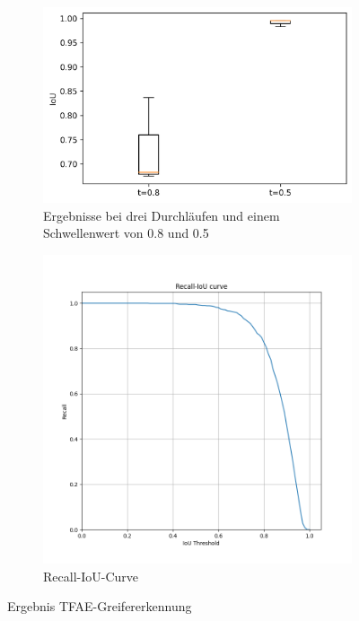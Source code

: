 	\begin{figure}[h]
		\centering
		\begin{subfigure}[c]{0.49\textwidth}			
			\includegraphics[width=1\textwidth,center]{bilder/Hauptteil/MT_Grapple/IoU_MT_Grapple.png}
			\caption{Ergebnisse bei drei Durchläufen und einem Schwellenwert von 0.8 und 0.5}
			\label{img:BoxPlot_0805_MT-Ansatz}	
		\end{subfigure}
		\begin{subfigure}[c]{0.49\textwidth}			
			\includegraphics[width=1\textwidth, center]{bilder/Hauptteil/MT_Grapple/Recall_IoU.png}
			\caption{Recall-IoU-Curve}
			\label{img:RecalllIoUt_MT}	
		\end{subfigure}
		\caption{Ergebnis TFAE-Greifererkennung}
		\label{img:ErgebnisRegressionMT}
	\end{figure}

